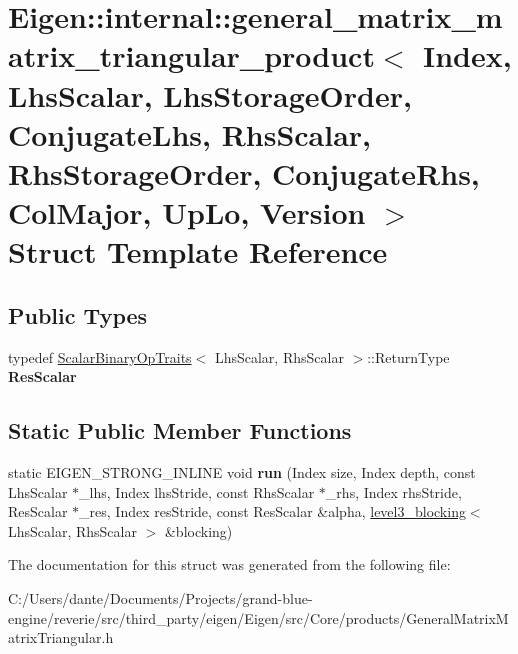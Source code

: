 \hypertarget{struct_eigen_1_1internal_1_1general__matrix__matrix__triangular__product_3_01_index_00_01_lhs_sc850fa7ad178159e52280c5aa1e0ab36e}{}\section{Eigen\+::internal\+::general\+\_\+matrix\+\_\+matrix\+\_\+triangular\+\_\+product$<$ Index, Lhs\+Scalar, Lhs\+Storage\+Order, Conjugate\+Lhs, Rhs\+Scalar, Rhs\+Storage\+Order, Conjugate\+Rhs, Col\+Major, Up\+Lo, Version $>$ Struct Template Reference}
\label{struct_eigen_1_1internal_1_1general__matrix__matrix__triangular__product_3_01_index_00_01_lhs_sc850fa7ad178159e52280c5aa1e0ab36e}
\subsection*{Public Types}
\begin{DoxyCompactItemize}
\item 
\mbox{\label{struct_eigen_1_1internal_1_1general__matrix__matrix__triangular__product_3_01_index_00_01_lhs_sc850fa7ad178159e52280c5aa1e0ab36e_a5837728f5a026cb28a4d543fd1b87772}} 
typedef \mbox{\hyperlink{struct_eigen_1_1_scalar_binary_op_traits}{Scalar\+Binary\+Op\+Traits}}$<$ Lhs\+Scalar, Rhs\+Scalar $>$\+::Return\+Type {\bfseries Res\+Scalar}
\end{DoxyCompactItemize}
\subsection*{Static Public Member Functions}
\begin{DoxyCompactItemize}
\item 
\mbox{\label{struct_eigen_1_1internal_1_1general__matrix__matrix__triangular__product_3_01_index_00_01_lhs_sc850fa7ad178159e52280c5aa1e0ab36e_aac5218bf3421bf8020039a80f083356d}} 
static E\+I\+G\+E\+N\+\_\+\+S\+T\+R\+O\+N\+G\+\_\+\+I\+N\+L\+I\+NE void {\bfseries run} (Index size, Index depth, const Lhs\+Scalar $\ast$\+\_\+lhs, Index lhs\+Stride, const Rhs\+Scalar $\ast$\+\_\+rhs, Index rhs\+Stride, Res\+Scalar $\ast$\+\_\+res, Index res\+Stride, const Res\+Scalar \&alpha, \mbox{\hyperlink{class_eigen_1_1internal_1_1level3__blocking}{level3\+\_\+blocking}}$<$ Lhs\+Scalar, Rhs\+Scalar $>$ \&blocking)
\end{DoxyCompactItemize}


The documentation for this struct was generated from the following file\+:\begin{DoxyCompactItemize}
\item 
C\+:/\+Users/dante/\+Documents/\+Projects/grand-\/blue-\/engine/reverie/src/third\+\_\+party/eigen/\+Eigen/src/\+Core/products/General\+Matrix\+Matrix\+Triangular.\+h\end{DoxyCompactItemize}
